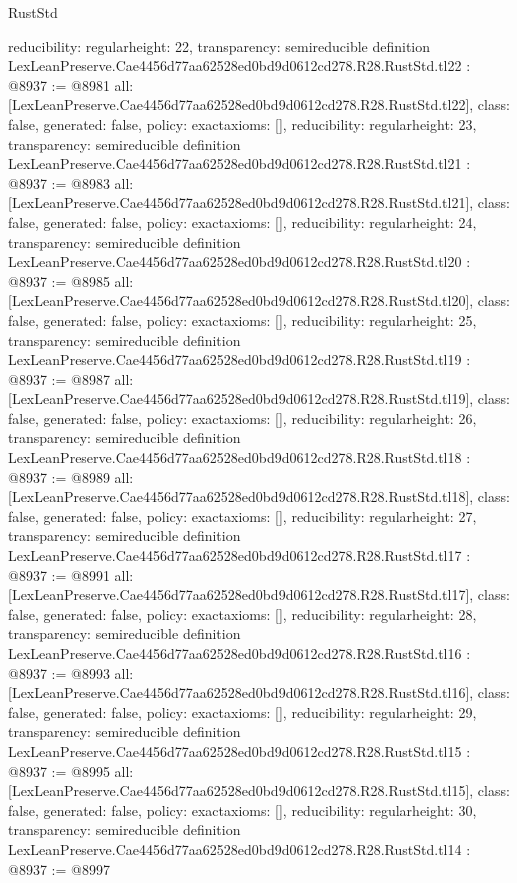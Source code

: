 \begin{lexlean}{RustStd}
\begin{coremodule}
{  reducibility: regular{height: 22},
  transparency: semireducible
}
definition LexLeanPreserve.Cae4456d77aa62528ed0bd9d0612cd278.R28.RustStd.tl22 : @8937 := @8981 {
  all: [LexLeanPreserve.Cae4456d77aa62528ed0bd9d0612cd278.R28.RustStd.tl22],
  class: false,
  generated: false,
  policy: exact{axioms: []},
  reducibility: regular{height: 23},
  transparency: semireducible
}
definition LexLeanPreserve.Cae4456d77aa62528ed0bd9d0612cd278.R28.RustStd.tl21 : @8937 := @8983 {
  all: [LexLeanPreserve.Cae4456d77aa62528ed0bd9d0612cd278.R28.RustStd.tl21],
  class: false,
  generated: false,
  policy: exact{axioms: []},
  reducibility: regular{height: 24},
  transparency: semireducible
}
definition LexLeanPreserve.Cae4456d77aa62528ed0bd9d0612cd278.R28.RustStd.tl20 : @8937 := @8985 {
  all: [LexLeanPreserve.Cae4456d77aa62528ed0bd9d0612cd278.R28.RustStd.tl20],
  class: false,
  generated: false,
  policy: exact{axioms: []},
  reducibility: regular{height: 25},
  transparency: semireducible
}
definition LexLeanPreserve.Cae4456d77aa62528ed0bd9d0612cd278.R28.RustStd.tl19 : @8937 := @8987 {
  all: [LexLeanPreserve.Cae4456d77aa62528ed0bd9d0612cd278.R28.RustStd.tl19],
  class: false,
  generated: false,
  policy: exact{axioms: []},
  reducibility: regular{height: 26},
  transparency: semireducible
}
definition LexLeanPreserve.Cae4456d77aa62528ed0bd9d0612cd278.R28.RustStd.tl18 : @8937 := @8989 {
  all: [LexLeanPreserve.Cae4456d77aa62528ed0bd9d0612cd278.R28.RustStd.tl18],
  class: false,
  generated: false,
  policy: exact{axioms: []},
  reducibility: regular{height: 27},
  transparency: semireducible
}
definition LexLeanPreserve.Cae4456d77aa62528ed0bd9d0612cd278.R28.RustStd.tl17 : @8937 := @8991 {
  all: [LexLeanPreserve.Cae4456d77aa62528ed0bd9d0612cd278.R28.RustStd.tl17],
  class: false,
  generated: false,
  policy: exact{axioms: []},
  reducibility: regular{height: 28},
  transparency: semireducible
}
definition LexLeanPreserve.Cae4456d77aa62528ed0bd9d0612cd278.R28.RustStd.tl16 : @8937 := @8993 {
  all: [LexLeanPreserve.Cae4456d77aa62528ed0bd9d0612cd278.R28.RustStd.tl16],
  class: false,
  generated: false,
  policy: exact{axioms: []},
  reducibility: regular{height: 29},
  transparency: semireducible
}
definition LexLeanPreserve.Cae4456d77aa62528ed0bd9d0612cd278.R28.RustStd.tl15 : @8937 := @8995 {
  all: [LexLeanPreserve.Cae4456d77aa62528ed0bd9d0612cd278.R28.RustStd.tl15],
  class: false,
  generated: false,
  policy: exact{axioms: []},
  reducibility: regular{height: 30},
  transparency: semireducible
}
definition LexLeanPreserve.Cae4456d77aa62528ed0bd9d0612cd278.R28.RustStd.tl14 : @8937 := @8997 {
}
\end{coremodule}
\end{lexlean}

